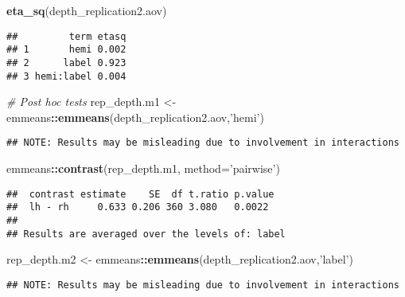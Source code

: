 \documentclass[
]{article}
\newenvironment{Shaded}{\begin{snugshade}}{\end{snugshade}}
\newcommand{\CommentTok}[1]{\textcolor[rgb]{0.56,0.35,0.01}{\textit{#1}}}
\newcommand{\DataTypeTok}[1]{\textcolor[rgb]{0.13,0.29,0.53}{#1}}
\newcommand{\KeywordTok}[1]{\textcolor[rgb]{0.13,0.29,0.53}{\textbf{#1}}}
\newcommand{\NormalTok}[1]{#1}
\newcommand{\OperatorTok}[1]{\textcolor[rgb]{0.81,0.36,0.00}{\textbf{#1}}}
\newcommand{\StringTok}[1]{\textcolor[rgb]{0.31,0.60,0.02}{#1}}
\begin{document}
\begin{Shaded}
\begin{Highlighting}[]
\KeywordTok{eta_sq}\NormalTok{(depth_replication2.aov)}
\end{Highlighting}
\end{Shaded}

\begin{verbatim}
##         term etasq
## 1       hemi 0.002
## 2      label 0.923
## 3 hemi:label 0.004
\end{verbatim}

\begin{Shaded}
\begin{Highlighting}[]
\CommentTok{# Post hoc tests }
\NormalTok{rep_depth.m1 <-}\StringTok{ }\NormalTok{emmeans}\OperatorTok{::}\KeywordTok{emmeans}\NormalTok{(depth_replication2.aov,}\StringTok{'hemi'}\NormalTok{)}
\end{Highlighting}
\end{Shaded}

\begin{verbatim}
## NOTE: Results may be misleading due to involvement in interactions
\end{verbatim}

\begin{Shaded}
\begin{Highlighting}[]
\NormalTok{emmeans}\OperatorTok{::}\KeywordTok{contrast}\NormalTok{(rep_depth.m1, }\DataTypeTok{method=}\StringTok{'pairwise'}\NormalTok{)}
\end{Highlighting}
\end{Shaded}

\begin{verbatim}
##  contrast estimate    SE  df t.ratio p.value
##  lh - rh     0.633 0.206 360 3.080   0.0022 
## 
## Results are averaged over the levels of: label
\end{verbatim}

\begin{Shaded}
\begin{Highlighting}[]
\NormalTok{rep_depth.m2 <-}\StringTok{ }\NormalTok{emmeans}\OperatorTok{::}\KeywordTok{emmeans}\NormalTok{(depth_replication2.aov,}\StringTok{'label'}\NormalTok{)}
\end{Highlighting}
\end{Shaded}

\begin{verbatim}
## NOTE: Results may be misleading due to involvement in interactions
\end{verbatim}
\end{document}
